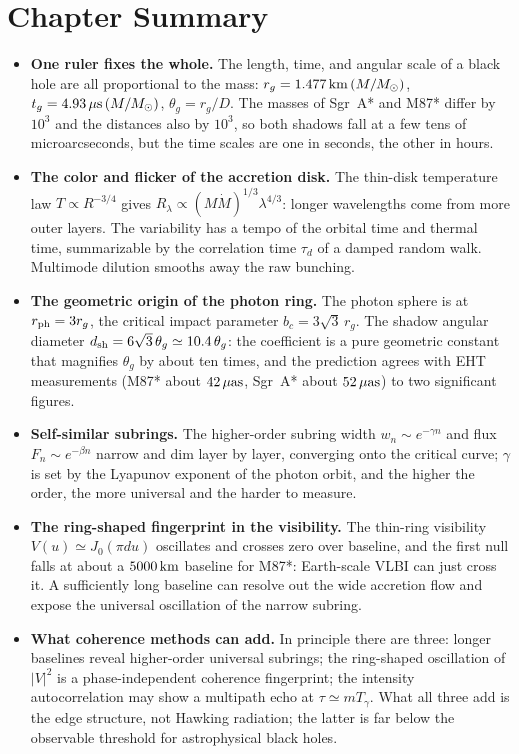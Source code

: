 \section{Chapter Summary}
\label{sec:e19-summary}

\begin{itemize}
\item \textbf{One ruler fixes the whole.} The length, time, and angular scale of a black hole are all proportional to the mass: \(r_g=1.477\,{\rm km}\,(M/M_\odot)\), \(t_g=4.93\,\mu{\rm s}\,(M/M_\odot)\), \(\theta_g=r_g/D\). The masses of Sgr~A* and M87* differ by \(10^3\) and the distances also by \(10^3\), so both shadows fall at a few tens of microarcseconds, but the time scales are one in seconds, the other in hours.
\item \textbf{The color and flicker of the accretion disk.} The thin-disk temperature law \(T\propto R^{-3/4}\) gives \(R_\lambda\propto(M\dot M)^{1/3}\lambda^{4/3}\): longer wavelengths come from more outer layers. The variability has a tempo of the orbital time and thermal time, summarizable by the correlation time \(\tau_d\) of a damped random walk. Multimode dilution smooths away the raw bunching.
\item \textbf{The geometric origin of the photon ring.} The photon sphere is at \(r_{\rm ph}=3r_g\), the critical impact parameter \(b_c=3\sqrt3\,r_g\). The shadow angular diameter \(d_{\rm sh}=6\sqrt3\,\theta_g\simeq10.4\,\theta_g\): the coefficient is a pure geometric constant that magnifies \(\theta_g\) by about ten times, and the prediction agrees with EHT measurements (M87* about \(42\,\mu{\rm as}\), Sgr~A* about \(52\,\mu{\rm as}\)) to two significant figures.
\item \textbf{Self-similar subrings.} The higher-order subring width \(w_n\sim e^{-\gamma n}\) and flux \(F_n\sim e^{-\beta n}\) narrow and dim layer by layer, converging onto the critical curve; \(\gamma\) is set by the Lyapunov exponent of the photon orbit, and the higher the order, the more universal and the harder to measure.
\item \textbf{The ring-shaped fingerprint in the visibility.} The thin-ring visibility \(V(u)\simeq J_0(\pi d u)\) oscillates and crosses zero over baseline, and the first null falls at about a \(5000\,{\rm km}\) baseline for M87*: Earth-scale VLBI can just cross it. A sufficiently long baseline can resolve out the wide accretion flow and expose the universal oscillation of the narrow subring.
\item \textbf{What coherence methods can add.} In principle there are three: longer baselines reveal higher-order universal subrings; the ring-shaped oscillation of \(|V|^2\) is a phase-independent coherence fingerprint; the intensity autocorrelation may show a multipath echo at \(\tau\simeq mT_\gamma\). What all three add is the edge structure, not Hawking radiation; the latter is far below the observable threshold for astrophysical black holes.
\end{itemize}

